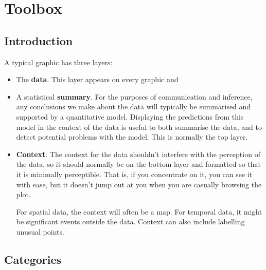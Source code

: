 

% 


\chapter{Toolbox}
\label{cha:toolbox}

\section{Introduction}\label{sec:introduction}

A typical graphic has three layers:

\begin{itemize}
  \item The {\bf data}.  This layer appears on every graphic and 

  \item A statistical {\bf summary}.  For the purposes of communication and inference, any conclusions we make about the data will typically be summarised and supported by a quantitative model.  Displaying the predictions from this model in the context of the data is useful to both summarise the data, and to detect potential problems with the model.  This is normally the top layer.

  \item {\bf Context}.  The context for the data shouldn't interfere with the perception of the data, so it should normally be on the bottom layer and formatted so that it is minimally perceptible.  That is, if you concentrate on it, you can see it with ease, but it doesn't jump out at you when you are casually browsing the plot.
  
  For spatial data, the context will often be a map.  For temporal data, it might be significant events outside the data.  Context can also include labelling unusual points.
\end{itemize}


\section{Categories}
\label{sec:categories}

